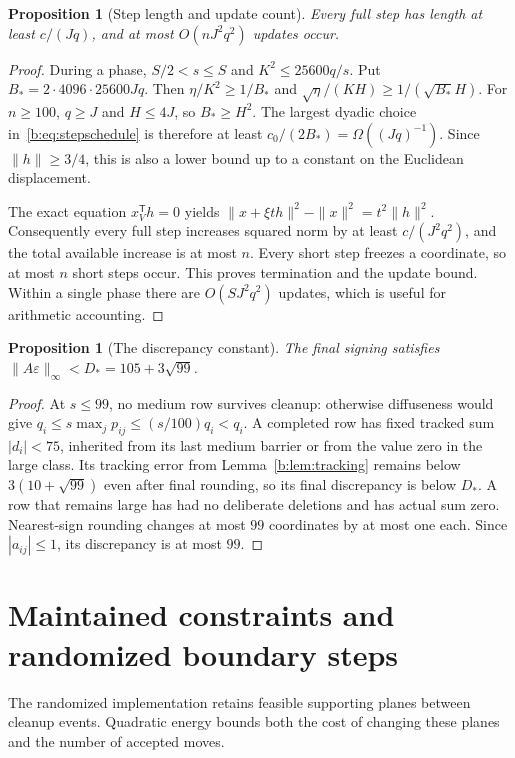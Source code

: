 \documentclass[11pt]{amsart}
\newtheorem{proposition}[theorem]{Proposition}
\theoremstyle{definition}\newtheorem{definition}[theorem]{Definition}
\theoremstyle{remark}\newtheorem{remark}[theorem]{Remark}
\numberwithin{equation}{section}
\newcommand{\eps}{\varepsilon}
\newcommand{\T}{\mathsf T}
\begin{document}
\begin{proposition}[Step length and update count]\label{b:prop:count}
Every full step has length at least $c/(Jq)$, and at most $O(nJ^2q^2)$
updates occur.
\end{proposition}
\begin{proof}
During a phase, $S/2<s\le S$ and $K^2\le25600q/s$.
Put $B_*=2\cdot4096\cdot25600Jq$. Then
$\eta/K^2\ge1/B_*$ and
$\sqrt\eta/(KH)\ge1/(\sqrt{B_*}H)$.
For $n\ge100$, $q\ge J$ and $H\le4J$, so $B_*\ge H^2$.
The largest dyadic choice in~\eqref{b:eq:stepschedule} is therefore at least
$c_0/(2B_*)=\Omega((Jq)^{-1})$.
Since $\|h\|\ge3/4$, this is also a lower bound up to a constant on the
Euclidean displacement.

The exact equation $x_V^\T h=0$ yields
$\|x+\xi th\|^2-\|x\|^2=t^2\|h\|^2$.
Consequently every full step increases squared norm by at least
$c/(J^2q^2)$, and the total available increase is at most $n$.
Every short step freezes a coordinate, so at most $n$ short steps occur.
This proves termination and the update bound. Within a single phase there are
$O(SJ^2q^2)$ updates, which is useful for arithmetic accounting.
\end{proof}

\begin{proposition}[The discrepancy constant]\label{b:prop:terminal}
The final signing satisfies $\|A\eps\|_\infty<D_*=105+3\sqrt{99}$.
\end{proposition}
\begin{proof}
At $s\le99$, no medium row survives cleanup: otherwise diffuseness would
give $q_i\le s\max_jp_{ij}\le(s/100)q_i<q_i$.
A completed row has fixed tracked sum $|d_i|<75$, inherited from its last
medium barrier or from the value zero in the large class. Its tracking error
from Lemma~\ref{b:lem:tracking} remains below $3(10+\sqrt{99})$ even after
final rounding, so its final discrepancy is below $D_*$.
A row that remains large has had no deliberate deletions and has actual
sum zero. Nearest-sign rounding changes at most $99$ coordinates by at most
one each. Since $|a_{ij}|\le1$, its discrepancy is at most $99$.
\end{proof}


\section{Maintained constraints and randomized boundary steps}\label{sec:maintained}
The randomized implementation retains feasible supporting planes
between cleanup events. Quadratic energy bounds both the cost of changing these planes and the
number of accepted moves.
\end{document}
